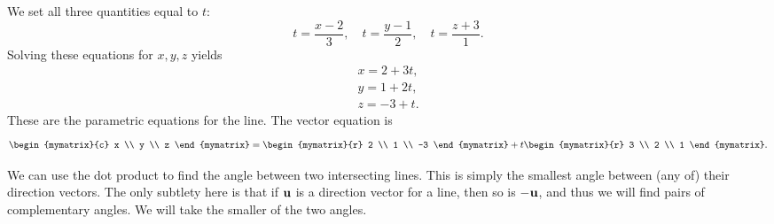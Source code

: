 \begin{solution}
  We set all three quantities equal to $t$:
  \begin{equation*}
    t=\frac{x-2}{3}, \quad
    t=\frac{y-1}{2}, \quad
    t=\frac{z+3}{1}.
  \end{equation*}
  Solving these equations for $x,y,z$ yields
  \begin{equation*}
    \begin{array}{c}
      x = 2 + 3t, \\
      y = 1 + 2t, \\
      z = -3 + t.
    \end{array}
  \end{equation*}
  These are the parametric equations for the line. The vector equation
  is
  \begin{equation*}
    \begin{mymatrix}{c}
      x \\
      y \\
      z
    \end{mymatrix} =
    \begin{mymatrix}{r}
      2 \\
      1 \\
      -3
    \end{mymatrix}
    +
    t
    \begin{mymatrix}{r}
      3 \\
      2 \\
      1
    \end{mymatrix}.
  \end{equation*}
\end{solution}

We can use the dot product to find the angle between two intersecting
lines. This is simply the smallest angle between (any of) their
direction vectors. The only subtlety here is that if $\vect{u}$ is a
direction vector for a line, then so is $-\vect{u}$, and thus we will
find pairs of complementary angles. We will take the smaller of the
two angles.
\begin{center} 
\end{center}

